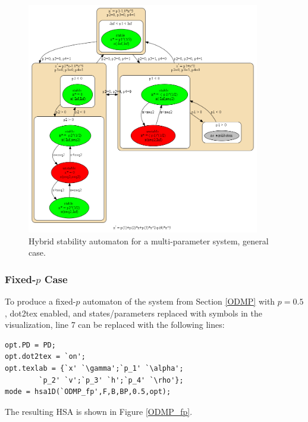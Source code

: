 \documentclass[12pt]{article}
\begin{document}
\begin{figure}[H]
\begin{center}
\includegraphics[width=4in]{ODMP_gen.png}
\caption{Hybrid stability automaton for a multi-parameter system, general case.}
\label{ODMP_gen}
\end{center}
\end{figure}


\subsubsection{Fixed-$p$ Case}
To produce a fixed-$p$ automaton of the system from Section \ref{ODMP} with $p=0.5$, dot2tex enabled, and states/parameters replaced with symbols in the visualization, line 7 can be replaced with the following lines:

\begin{addmargin}[0.5in]{1em}
\begin{lstlisting}
opt.PD = PD;
opt.dot2tex = `on';
opt.texlab = {`x' `\gamma';`p_1' `\alpha';
		`p_2' `v';`p_3' `h';`p_4' `\rho'};
mode = hsa1D(`ODMP_fp',F,B,BP,0.5,opt);
\end{lstlisting}
\end{addmargin}

\noindent The resulting HSA is shown in Figure \ref{ODMP_fp}.
\end{document}
